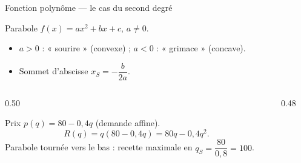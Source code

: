 \documentclass[10pt,aspectratio=169]{beamer}
\numberwithin{dummy}{section}
\newcommand{\Rec}{R}
\begin{document}
\begin{frame}{Fonction polynôme --- le cas du second degré}
\begin{block}{Parabole}
$f(x)=ax^2+bx+c$, $a\neq 0$.
\begin{itemize}
    \item $a>0$ : « sourire » (convexe) ; $a<0$ : « grimace » (concave).
    \item Sommet d'abscisse $x_S=-\dfrac{b}{2a}$.
\end{itemize}
\end{block}

\begin{columns}[T]
\begin{column}{0.50\textwidth}
\begin{boxgestion}[Recette]
Prix $p(q)=80-0{,}4q$ (demande affine).
\[
\Rec(q)=q(80-0{,}4q)=80q-0{,}4q^2.
\]
Parabole tournée vers le bas : recette maximale en
$q_S=\dfrac{80}{0{,}8}=100$.
\end{boxgestion}
\end{column}
\begin{column}{0.48\textwidth}
\centering
{}
\end{column}
\end{columns}
\end{frame}
\end{document}
